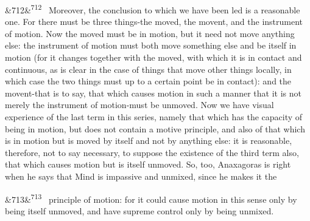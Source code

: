 \documentclass[12pt]{article}
\newcommand{\para}[1][]{\par\noindent\ifx&#1&\else\textsuperscript{\footnotesize #1}~\fi}
\begin{document}
\para[712] Moreover, the conclusion to which we have been led is a reasonable one. For there must be three things-the moved, the movent, and the instrument of motion. Now the moved must be in motion, but it need not move anything else: the instrument of motion must both move something else and be itself in motion (for it changes together with the moved, with which it is in contact and continuous, as is clear in the case of things that move other things locally, in which case the two things must up to a certain point be in contact): and the movent-that is to say, that which causes motion in such a manner that it is not merely the instrument of motion-must be unmoved. Now we have visual experience of the last term in this series, namely that which has the capacity of being in motion, but does not contain a motive principle, and also of that which is in motion but is moved by itself and not by anything else: it is reasonable, therefore, not to say necessary, to suppose the existence of the third term also, that which causes motion but is itself unmoved. So, too, Anaxagoras is right when he says that Mind is impassive and unmixed, since he makes it the

\para[713] principle of motion: for it could cause motion in this sense only by being itself unmoved, and have supreme control only by being unmixed.
\end{document}
